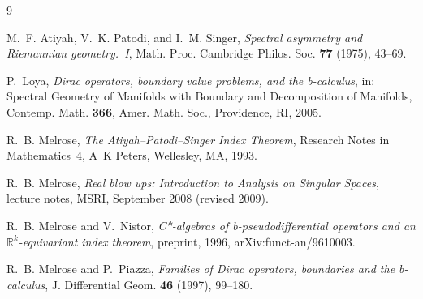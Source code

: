 \documentclass[12pt,oneside,reqno]{article}
\theoremstyle{plain}
\theoremstyle{definition}
\theoremstyle{remark}
\begin{document}
\begin{thebibliography}{9}

M.~F. Atiyah, V.~K. Patodi, and I.~M. Singer,
\emph{Spectral asymmetry and Riemannian geometry.~I},
Math. Proc. Cambridge Philos. Soc. \textbf{77} (1975), 43--69.

P.~Loya,
\emph{Dirac operators, boundary value problems, and the b-calculus},
in: Spectral Geometry of Manifolds with Boundary and Decomposition of
Manifolds, Contemp. Math. \textbf{366}, Amer. Math. Soc., Providence,
RI, 2005.

R.~B. Melrose,
\emph{The Atiyah--Patodi--Singer Index Theorem},
Research Notes in Mathematics~4, A~K Peters, Wellesley, MA, 1993.

R.~B. Melrose,
\emph{Real blow ups: Introduction to Analysis on Singular Spaces},
lecture notes, MSRI, September 2008 (revised 2009).

R.~B. Melrose and V.~Nistor,
\emph{C*-algebras of b-pseudodifferential operators and an
\(\mathbb R^k\)-equivariant index theorem},
preprint, 1996, arXiv:funct-an/9610003.

R.~B. Melrose and P.~Piazza,
\emph{Families of Dirac operators, boundaries and the b-calculus},
J. Differential Geom. \textbf{46} (1997), 99--180.

\end{thebibliography}
\end{document}

